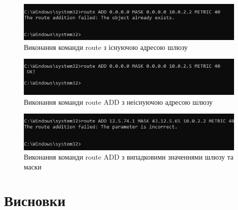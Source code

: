 \documentclass{article}
\begin{document}
\begin{normalsize}
\begin{figure}[H]
	\centering
	\includegraphics[width=\textwidth]{32}
	\caption{Виконання команди route з існуючою адресою шлюзу}
\end{figure}

\begin{figure}[H]
	\centering
	\includegraphics[width=\textwidth]{33}
	\caption{Виконання команди route ADD з неіснуючою адресою шлюзу}
\end{figure}

\begin{figure}[H]
	\centering
	\includegraphics[width=\textwidth]{34}
	\caption{Виконання команди route ADD з випадковими значеннями шлюзу та маски}
\end{figure}

\section*{Висновки}
	    
\end{normalsize}
\end{document}
